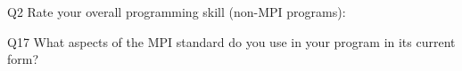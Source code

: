 \begin{description}%
\item{Q2} Rate your overall programming skill (non-MPI programs):%
\item{Q17} What aspects of the MPI standard do you use in your program in its current form?%
\end{description}%
